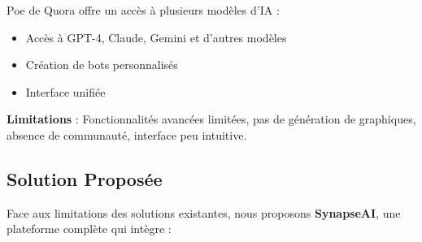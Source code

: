 Poe de Quora offre un accès à plusieurs modèles d'IA :
\begin{itemize}
    \item Accès à GPT-4, Claude, Gemini et d'autres modèles
    \item Création de bots personnalisés
    \item Interface unifiée
\end{itemize}

\textbf{Limitations} : Fonctionnalités avancées limitées, pas de génération de graphiques, absence de communauté, interface peu intuitive.

\subsection{Solution Proposée}

Face aux limitations des solutions existantes, nous proposons \textbf{SynapseAI}, une plateforme complète qui intègre :

